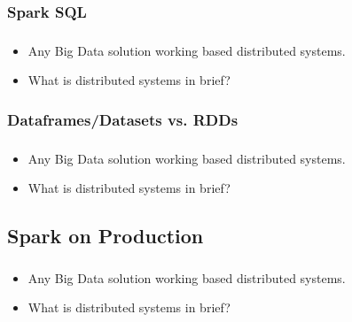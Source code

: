 
\subsubsection{Spark SQL}
\begin{frame}
  \frametitle{\subsecname}
	\begin{itemize}[<+->]
		\item Any Big Data solution working based distributed systems.
		\item What is distributed systems in brief?
	\end{itemize}
\end{frame}


\subsubsection{Dataframes/Datasets vs. RDDs}

\begin{frame}
  \frametitle{\subsecname}
	\begin{itemize}[<+->]
		\item Any Big Data solution working based distributed systems.
		\item What is distributed systems in brief?
	\end{itemize}
\end{frame}

\subsection{Spark on Production}

\begin{frame}
  \frametitle{\subsecname}
	\begin{itemize}[<+->]
		\item Any Big Data solution working based distributed systems.
		\item What is distributed systems in brief?
	\end{itemize}
\end{frame}

